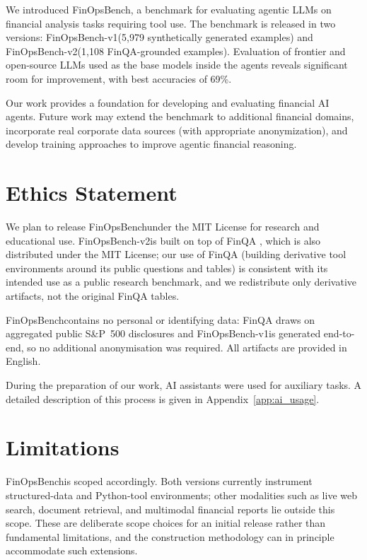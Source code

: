 \documentclass[11pt]{article}
\newcommand{\datasetname}{FinOpsBench}\xspace
\newcommand{\synthsubset}{FinOpsBench-v1}\xspace
\newcommand{\groundedfinqa}{FinOpsBench-v2}\xspace
\begin{document}
We introduced \datasetname, a benchmark for evaluating agentic LLMs on financial analysis tasks requiring tool use. The benchmark is released in two versions: \synthsubset (5,979 synthetically generated examples) and \groundedfinqa (1,108 FinQA-grounded examples). Evaluation of frontier and open-source LLMs used as the base models inside the agents reveals significant room for improvement, with best accuracies of 69\%.

Our work provides a foundation for developing and evaluating financial AI agents. Future work may extend the benchmark to additional financial domains, incorporate real corporate data sources (with appropriate anonymization), and develop training approaches to improve agentic financial reasoning.

\section*{Ethics Statement}

We plan to release \datasetname under the MIT License for research and educational use. \groundedfinqa is built on top of FinQA \citep{chen2021finqa}, which is also distributed under the MIT License; our use of FinQA (building derivative tool environments around its public questions and tables) is consistent with its intended use as a public research benchmark, and we redistribute only derivative artifacts, not the original FinQA tables.

\datasetname contains no personal or identifying data: FinQA draws on aggregated public S\&P~500 disclosures and \synthsubset is generated end-to-end, so no additional anonymisation was required. All artifacts are provided in English.

During the preparation of our work, AI assistants were used for auxiliary tasks. A detailed description of this process is given in Appendix~\ref{app:ai_usage}.

\section*{Limitations}

\datasetname is scoped accordingly. Both versions currently instrument structured-data and Python-tool environments; other modalities such as live web search, document retrieval, and multimodal financial reports lie outside this scope. These are deliberate scope choices for an initial release rather than fundamental limitations, and the construction methodology can in principle accommodate such extensions.
\end{document}

